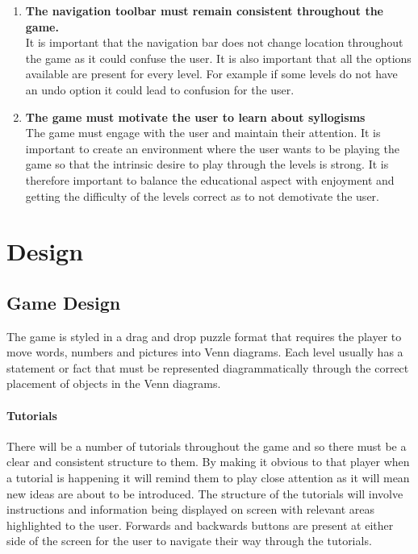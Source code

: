 \documentclass[12pt,a4paper]{report}
\begin{document}
\begin{enumerate}[label*=\arabic*]
                                      \item \textbf{The navigation toolbar must remain consistent throughout the game.
                                      }\\
It is important that the navigation bar does not change location throughout the game as it could confuse the user. It is also important that all the options available are present for every level. For example if some levels do not have an undo option it could lead to confusion for the user.

                                      \item \textbf{The game must motivate the user to learn about syllogisms
}\\
The game must engage with the user and maintain their attention. It is important to create an environment where the user wants to be playing the game so that the intrinsic desire to play through the levels is strong. It is therefore important to balance the educational aspect with enjoyment and getting the difficulty of the levels correct as to not demotivate the user.
            \end{enumerate}
            
\chapter{Design}


\section{Game Design}
The game is styled in a drag and drop puzzle format that requires the player to move words, numbers and pictures into Venn diagrams. Each level usually has a statement or fact that must be represented diagrammatically through the correct placement of objects in the Venn diagrams.

\subsubsection{Tutorials}
There will be a number of tutorials throughout the game and so there must be a clear and consistent structure to them. By making it obvious to that player when a tutorial is happening it will remind them to play close attention as it will mean new ideas are about to be introduced. The structure of the tutorials will involve instructions and information being displayed on screen with relevant areas highlighted to the user. Forwards and backwards buttons are present at either side of the screen for the user to navigate their way through the tutorials. 
\end{document}
